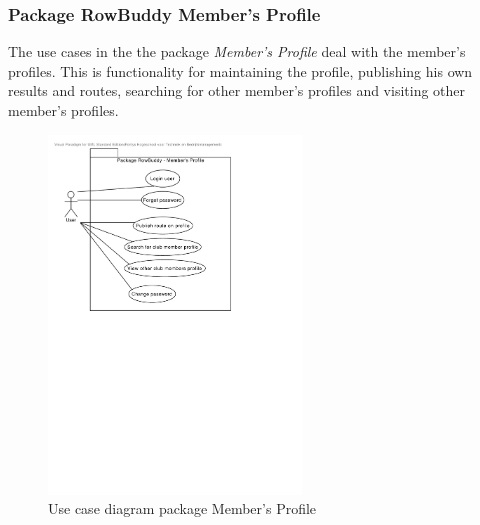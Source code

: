 		
		\subsubsection{Package RowBuddy Member's Profile}
The use cases in the the package \emph{Member's Profile} deal with the member's profiles. This is functionality for maintaining the profile, publishing his own results and routes, searching for other member's profiles and visiting other member's profiles.\\
	
		\begin{figure}[H]
			\begin{center}
				\includegraphics[width=0.6\textwidth]{./figures/04_MembersProfile.pdf}
				\caption{Use case diagram package Member's Profile}
				\label{img:UCmembersProfile}
			\end{center}
		\end{figure}


